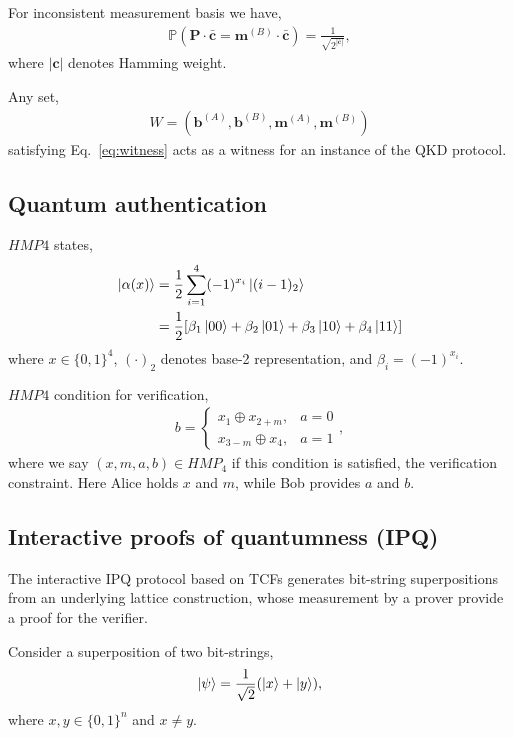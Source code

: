 \documentclass[twocolumn, aps, amsmath, amssymb, nofootinbib, superscriptaddress, longbibliography, doublefloatfix, table-of-contents, eqsecnum, rmp]{revtex4-2}
\begin{document}
For inconsistent measurement basis we have,
\begin{align}
	\mathbb{P}(\mathbf{P} \cdot \bar{\mathbf{c}} = \mathbf{m}^{(B)} \cdot \bar{\mathbf{c}}) = \frac{1}{\sqrt{2^{|\bar{\mathbf{c}}|}}},
\end{align}
where $|\mathbf{c}|$ denotes Hamming weight.

Any set,
\begin{align}
	W=(\mathbf{b}^{(A)},\mathbf{b}^{(B)},\mathbf{m}^{(A)},\mathbf{m}^{(B)})
\end{align}
satisfying Eq.~\eqref{eq:witness} acts as a witness for an instance of the QKD protocol. 

\subsection{Quantum authentication}

$HMP4$ states,
\begin{align}
	\ket{\alpha(x)} &= \frac{1}{2} \sum_{i=1}^4 (-1)^{x_i} \ket{(i-1)_2} \nonumber\\
	&= \frac{1}{2}[\beta_1\ket{00} + \beta_2\ket{01} + \beta_3\ket{10} + \beta_4\ket{11}] \nonumber\\
\end{align}
where $x\in\{0,1\}^4$, $(\cdot)_2$ denotes base-2 representation, and $\beta_i=(-1)^{x_i}$.

$HMP4$ condition for verification,
\begin{align}
	b = \begin{cases}
		x_1 \oplus x_{2+m}, &a=0 \nonumber\\
		x_{3-m} \oplus x_4, &a=1
 	\end{cases},
\end{align}
where we say $(x,m,a,b)\in HMP_4$ if this condition is satisfied, the verification constraint. Here Alice holds $x$ and $m$, while Bob provides $a$ and $b$.

\subsection{Interactive proofs of quantumness (IPQ)}

The interactive IPQ protocol based on TCFs generates bit-string superpositions from an underlying lattice construction, whose measurement by a prover provide a proof for the verifier. 

Consider a superposition of two bit-strings,
\begin{align}
	\ket\psi = \frac{1}{\sqrt{2}}(\ket{x}+\ket{y}),
\end{align}
where $x,y\in\{0,1\}^n$ and $x\neq y$.
\end{document}
